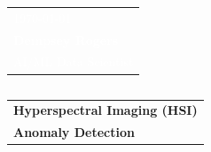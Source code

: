 \begin{frame}{}
    \begin{columns}[c]
        \begin{column}{.2\textwidth}
            \vspace{-1.9in}
            \begin{table}[]
                \begin{tabular}{l}
                    \textcolor{white}{\tiny{\today}}\\[4pt]
                    \textbf{\textcolor{white}{\footnotesize Dempsey Rogers}}\\
                    \textcolor{white}{\footnotesize AI/ML Data Scientist}
                \end{tabular}
            \end{table}
            
        \end{column}
            \hfill
        \begin{column}{.8\textwidth}
           \vspace{.45in}
        \end{column}
    \end{columns}
    
    \vspace{-.2in}
    \hspace{-.2in}
        
    \begin{table}[]
        \begin{tabular}{l}
            \textbf{\LARGE{Hyperspectral Imaging (HSI)}}\\[4pt] 
            \textbf{\LARGE{Anomaly Detection}}\\[4pt]
        \end{tabular}
    \end{table}
\end{frame}

